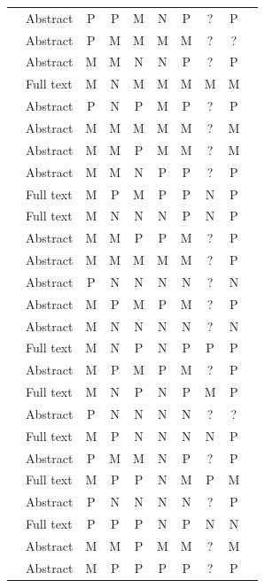 \documentclass[10pt,a4paper]{article}
\begin{document}
\begin{longtable}{@{}P{5.2cm}P{1.6cm}cccccccc@{}}
\citet{Uprety2024} & Abstract & P & P & M & N & P & ? & P \\
\citet{Zhang2025} & Abstract & P & M & M & M & M & ? & ? \\
\citet{Maksimovic2025} & Abstract & M & M & N & N & P & ? & P \\
\citet{Lo2025} & Full text & M & N & M & M & M & M & M \\
\citet{Aerts2026} & Abstract & P & N & P & M & P & ? & P \\
\citet{Imannezhad2026} & Abstract & M & M & M & M & M & ? & M \\
\citet{Kang2026} & Abstract & M & M & P & M & M & ? & M \\
\citet{Dong2008} & Abstract & M & M & N & P & P & ? & P \\
\citet{Dong2012} & Full text & M & P & M & P & P & N & P \\
\citet{Briegel2012} & Full text & M & N & N & N & P & N & P \\
\citet{Melnikov2018} & Abstract & M & M & P & P & M & ? & P \\
\citet{Wei2022} & Abstract & M & M & M & M & M & ? & P \\
\citet{Lukac2007} & Abstract & P & N & N & N & N & ? & N \\
\citet{Hangl2016} & Abstract & M & P & M & P & M & ? & P \\
\citet{Yan2019} & Abstract & M & N & N & N & N & ? & N \\
\citet{Lanza2020} & Full text & M & N & P & N & P & P & P \\
\citet{Hangl2020} & Abstract & M & P & M & P & M & ? & P \\
\citet{Lanza2021} & Full text & M & N & P & N & P & M & P \\
\citet{Yan2021c} & Abstract & P & N & N & N & N & ? & ? \\
\citet{Ho2022} & Full text & M & P & N & N & N & N & P \\
\citet{Song2022} & Abstract & P & M & M & N & P & ? & P \\
\citet{Widdows2023} & Full text & M & P & P & N & M & P & M \\
\citet{Mannone2024} & Abstract & P & N & N & N & N & ? & P \\
\citet{Daglarli2025} & Full text & P & P & P & N & P & N & N \\
\citet{Chella2026} & Abstract & M & M & P & M & M & ? & M \\
\citet{Yukalov2018} & Abstract & M & P & P & P & P & ? & P \\

\end{longtable}
\end{document}
